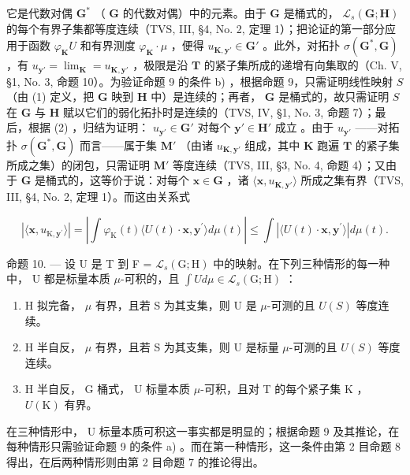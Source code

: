 它是代数对偶 \(\mathbf{G}^*\) （ \(\mathbf{G}\) 的代数对偶）中的元素。由于 \(\mathbf{G}\) 是桶式的， \(\mathcal{L}_s(\mathbf{G};\mathbf{H})\) 的每个有界子集都等度连续（TVS, III, §4, No. 2, 定理 1）；把论证的第一部分应用于函数 \(\varphi_{\mathbf{K}}U\) 和有界测度 \(\varphi_{\mathbf{K}}\cdot \mu\) ，便得 \(u_{\mathbf{K},\mathbf{y}'}\in \mathbf{G}'\) 。此外，对拓扑 \(\sigma (\mathbf{G}^{*},\mathbf{G})\) ，有 \(u_{\mathbf{y}'} = \lim_{\mathbf{K}} = u_{\mathbf{K},\mathbf{y}'}\) ，极限是沿 \(\mathbf{T}\) 的紧子集所成的递增有向集取的（Ch. V, §1, No. 3, 命题 10）。为验证命题 9 的条件 b) ，根据命题 9，只需证明线性映射 \(S\) （由 (1) 定义，把 \(\mathbf{G}\) 映到 \(\mathbf{H}\) 中）是连续的；再者， \(\mathbf{G}\) 是桶式的，故只需证明 \(S\) 在 \(\mathbf{G}\) 与 \(\mathbf{H}\) 赋以它们的弱化拓扑时是连续的（TVS, IV, §1, No. 3, 命题 7）；最后，根据 (2) ，归结为证明： \(u_{\mathbf{y}'}\in \mathbf{G}'\) 对每个 \(\mathbf{y}'\in \mathbf{H}'\) 成立 。由于 \(u_{\mathbf{y}'}\) ——对拓扑 \(\sigma (\mathbf{G}^{*},\mathbf{G})\) 而言——属于集 \(\mathbf{M}'\) （由诸 \(u_{\mathbf{K},\mathbf{y}'}\) 组成，其中 \(\mathbf{K}\) 跑遍 \(\mathbf{T}\) 的紧子集所成之集）的闭包，只需证明 \(\mathbf{M}'\) 等度连续（TVS, III, §3, No. 4, 命题 4）；又由于 \(\mathbf{G}\) 是桶式的，这等价于说：对每个 \(\mathbf{x}\in \mathbf{G}\) ，诸 \(\langle \mathbf{x},u_{\mathbf{K},\mathbf{y}'}\rangle\) 所成之集有界（TVS, III, §4, No. 2, 定理 1）。而这由关系式

\[
| \langle \mathbf {x}, u _ {\mathrm{K}, \mathbf {y} ^ {\prime}} \rangle | = \left| \int \varphi_ {\mathrm{K}} (t) \langle U (t) \cdot \mathbf {x}, \mathbf {y} ^ {\prime} \rangle d \mu (t) \right| \leqslant \int | \langle U (t) \cdot \mathbf {x}, \mathbf {y} ^ {\prime} \rangle | d \mu (t).
\]

命题 10. --- 设 U 是 T 到 F = \(\mathcal{L}_s(\mathrm{G};\mathrm{H})\) 中的映射。在下列三种情形的每一种中， U 都是标量本质 \(\mu\)-可积的，且 \(\int U d\mu \in \mathcal{L}_s(\mathrm{G};\mathrm{H})\) ：

\begin{enumerate}
\def\labelenumi{\alph{enumi})}
\item
  H 拟完备， \(\mu\) 有界，且若 S 为其支集，则 U 是 \(\mu\)-可测的且 \(U(S)\) 等度连续。
\item
  H 半自反， \(\mu\) 有界，且若 S 为其支集，则 U 是标量 \(\mu\)-可测的且 \(U(S)\) 等度连续。
\item
  H 半自反， G 桶式， U 标量本质 \(\mu\)-可积，且对 T 的每个紧子集 K ， \(U(\mathrm{K})\) 有界。
\end{enumerate}

在三种情形中， U 标量本质可积这一事实都是明显的；根据命题 9 及其推论，在每种情形只需验证命题 9 的条件 a) 。而在第一种情形，这一条件由第 2 目命题 8 得出，在后两种情形则由第 2 目命题 7 的推论得出。


